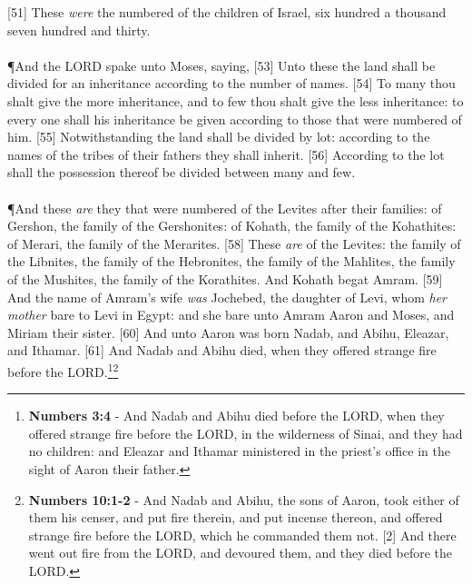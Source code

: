 [51] \textcolor[cmyk]{0.99998,1,0,0}{These \emph{were} the numbered of the children of Israel, six hundred  a thousand seven hundred and thirty.}\\
\\
\P \textcolor[cmyk]{0.99998,1,0,0}{And the LORD spake unto Moses, saying,}
[53] \textcolor[cmyk]{0.99998,1,0,0}{Unto these the land shall be divided for an inheritance according to the number of names.}
[54] \textcolor[cmyk]{0.99998,1,0,0}{To many thou shalt give the more inheritance, and to few thou shalt give the less inheritance: to every one shall his inheritance be given according to those that were numbered of him.}
[55] \textcolor[cmyk]{0.99998,1,0,0}{Notwithstanding the land shall be divided by lot: according to the names of the tribes of their fathers they shall inherit.}
[56] \textcolor[cmyk]{0.99998,1,0,0}{According to the lot shall the possession thereof be divided between many and few.}\\
\\
\P \textcolor[cmyk]{0.99998,1,0,0}{And these \emph{are} they that were numbered of the Levites after their families: of Gershon, the family of the Gershonites: of Kohath, the family of the Kohathites: of Merari, the family of the Merarites.}
[58] \textcolor[cmyk]{0.99998,1,0,0}{These \emph{are}  of the Levites: the family of the Libnites, the family of the Hebronites, the family of the Mahlites, the family of the Mushites, the family of the Korathites. And Kohath begat Amram.}
[59] \textcolor[cmyk]{0.99998,1,0,0}{And the name of Amram's wife \emph{was} Jochebed, the daughter of Levi, whom \emph{her} \emph{mother} bare to Levi in Egypt: and she bare unto Amram Aaron and Moses, and Miriam their sister.}
[60] \textcolor[cmyk]{0.99998,1,0,0}{And unto Aaron was born Nadab, and Abihu, Eleazar, and Ithamar.}
[61] \textcolor[cmyk]{0.99998,1,0,0}{And Nadab and Abihu died, when they offered strange fire before the LORD.}\footnote{\textbf{Numbers 3:4} - And Nadab and Abihu died before the LORD, when they offered strange fire before the LORD, in the wilderness of Sinai, and they had no children: and Eleazar and Ithamar ministered in the priest’s office in the sight of Aaron their father.}\footnote{\textbf{Numbers 10:1-2} - And Nadab and Abihu, the sons of Aaron, took either of them his censer, and put fire therein, and put incense thereon, and offered strange fire before the LORD, which he commanded them not. [2] And there went out fire from the LORD, and devoured them, and they died before the LORD.}
